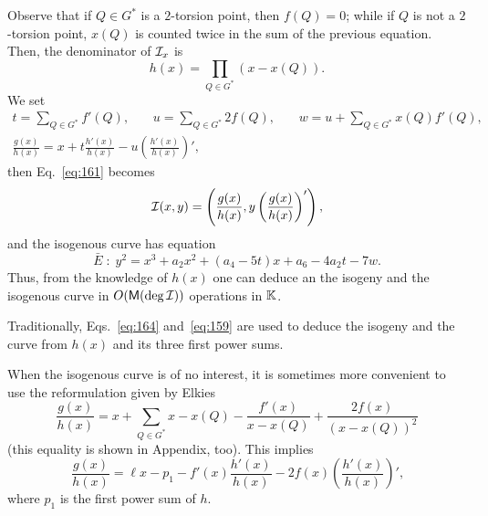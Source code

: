 Observe that if $Q\in G^\ast$ is a $2$-torsion point, then $f(Q)=0$;
while if $Q$ is not a $2$-torsion point, $x(Q)$ is counted twice in
the sum of the previous equation. Then, the denominator of $\mathcal{I}_x$ is
  \begin{equation}
    \label{eq:158}
    h(x) = \prod_{Q\in G^\ast}(x - x(Q))
    \text{.}
  \end{equation}
We set
\begin{equation}
  \label{eq:164}
  \begin{gathered}
    t = \sum_{Q\in G^\ast} f'(Q)\text{,}
    \qquad
    u = \sum_{Q\in G^\ast} 2f(Q)\text{,}
    \qquad
    w = u + \sum_{Q\in G^\ast} x(Q)f'(Q)\text{,}\\
    \frac{g(x)}{h(x)} = x + t\frac{h'(x)}{h(x)} - u\left(\frac{h'(x)}{h(x)}\right)'
    \text{,}
  \end{gathered}
\end{equation}
then Eq.~\eqref{eq:161} becomes
\begin{equation}
  \label{eq:159}
  \mathcal{I}(x,y) = \left(\frac{g(x)}{h(x)}, y\left(\frac{g(x)}{h(x)}\right)'\right)
  \text{,}
\end{equation}
and the isogenous curve has equation
\begin{equation}
  \label{eq:163}
  \bar{E}\;:\;y^2 = x^3 + a_2x^2 + (a_4-5t)x + a_6 - 4a_2t - 7w
  \text{.}
\end{equation}
Thus, from the knowledge of $h(x)$ one can deduce an the isogeny and
the isogenous curve in $O(\mathsf{M}(\deg\mathcal{I}))$ operations in $\mathbb{K}$.

\begin{remark}
  Traditionally, Eqs.~\eqref{eq:164} and~\eqref{eq:159} are used to
  deduce the isogeny and the curve from $h(x)$ and its three first
  power sums.

  When the isogenous curve is of no interest, it is sometimes more
  convenient to use the reformulation given by Elkies~\cite{elkies98}
  \begin{equation}
    \label{eq:157}
    \frac{g(x)}{h(x)} = x + \sum_{Q\in G^\ast}x - x(Q) - \frac{f'(x)}{x-x(Q)} + \frac{2f(x)}{(x-x(Q))^2}
  \end{equation}
  (this equality is shown in Appendix, too). This implies
  \begin{equation}
    \label{eq:165}
    \frac{g(x)}{h(x)} = \ell x - p_1 - f'(x)\frac{h'(x)}{h(x)} -
    2f(x)\left(\frac{h'(x)}{h(x)}\right)'
    \text{,}
  \end{equation}
  where $p_1$ is the first power sum of $h$.
\end{remark}

